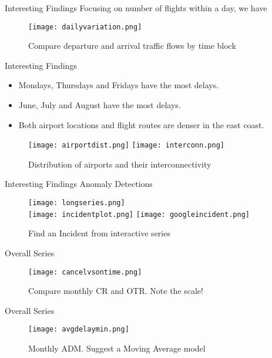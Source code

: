 \documentclass[11pt]{beamer}
\begin{document}
\begin{frame}{Interesting Findings}
Focusing on number of flights within a day,  we have
\center
\begin{figure}
\texttt{[image: dailyvariation.png]} 
\small
\caption{Compare departure and arrival traffic flows by time block}
\end{figure}
\end{frame}

\begin{frame}{Interesting Findings}
\begin{itemize}
\item Mondays, Thursdays and Fridays have the most delays.
\item June, July and August have the most delays.
\item Both airport locations and flight routes are denser in the east coast.
\end{itemize}
\center
\begin{figure}
\texttt{[image: airportdist.png]} 
\texttt{[image: interconn.png]} 
\small
\caption{Distribution of airports and their interconnectivity}
\end{figure}
\end{frame}

\begin{frame}{Interesting Findings}
Anomaly Detections
\center
\begin{figure}
\texttt{[image: longseries.png]} \\
\texttt{[image: incidentplot.png]} 
\texttt{[image: googleincident.png]}
\small
\caption{Find an Incident from interactive series}
\end{figure}
\end{frame}

\begin{frame}{Overall Series}
\center
\begin{figure}
\texttt{[image: cancelvsontime.png]}
\caption{Compare monthly CR and OTR.  Note the scale!}
\end{figure}
\end{frame}

\begin{frame}{Overall Series}
\center
\begin{figure}
\texttt{[image: avgdelaymin.png]}
\caption{Monthly ADM.  Suggest a Moving Average model}
\end{figure}
\end{frame}
\end{document}
